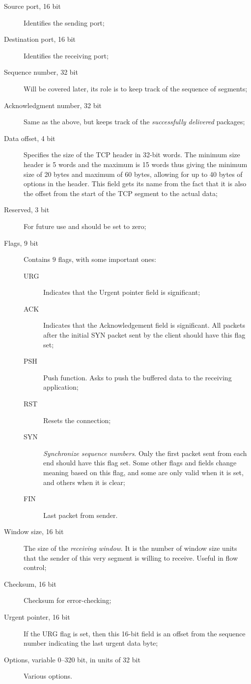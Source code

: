 \documentclass[10pt]{\classname}
\begin{document}
\begin{description}
    \item[Source port, 16 bit] Identifies the sending port;
    \item[Destination port, 16 bit] Identifies the receiving port;
    \item[Sequence number, 32 bit] Will be covered later, its role is to keep
        track of the sequence of segments;
    \item[Acknowledgment number, 32 bit] Same as the above, but keeps track
        of the \emph{successfully delivered} packages;
    \item[Data offset, 4 bit] Specifies the size of the TCP header in 32-bit
        words. The minimum size header is 5 words and the maximum is 15 words
        thus giving the minimum size of 20 bytes and maximum of 60 bytes,
        allowing for up to 40 bytes of options in the header. This field gets
        its name from the fact that it is also the offset from the start of the
        TCP segment to the actual data;
    \item[Reserved, 3 bit] For future use and should be set to zero;
    \item[Flags, 9 bit] Contains $9$ flags, with some important ones:
        \begin{description}
            \item[URG] Indicates that the Urgent pointer field is significant;
            \item[ACK] Indicates that the Acknowledgement field is significant. All
                packets after the initial SYN packet sent by the client should have
                this flag set;
            \item[PSH] Push function. Asks to push the buffered data to the
                receiving application;
            \item[RST] Resets the connection;
            \item[SYN] \emph{Synchronize sequence numbers}. Only the first packet sent
                from each end should have this flag set. Some other flags and
                fields change meaning based on this flag, and some are only valid
                when it is set, and others when it is clear;
            \item[FIN] Last packet from sender.
        \end{description}
    \item[Window size, 16 bit] The size of the \emph{receiving window}. It is
        the number of window size units that the sender of this very segment is
        willing to receive. Useful in flow control;
    \item[Checksum, 16 bit] Checksum for error\--checking;
    \item[Urgent pointer, 16 bit] If the URG flag is set, then this 16-bit
        field is an offset from the sequence number indicating the last urgent
        data byte;
    \item[Options, variable 0–320 bit, in units of 32 bit] Various options.
\end{description}
\end{document}

